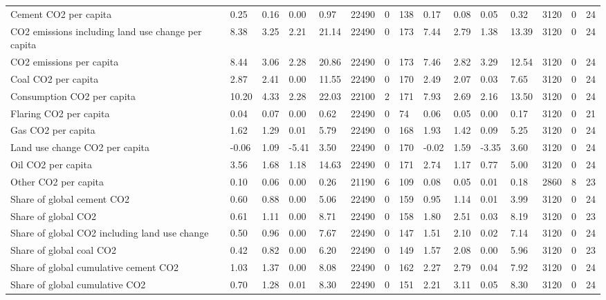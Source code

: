 \begin{longtable}{lllllllllllllll}
\addlinespace
Cement CO2 per capita & 0.25 & 0.16 & 0.00 & 0.97 & 22490 & 0 & 138 & 0.17 & 0.08 & 0.05 & 0.32 & 3120 & 0 & 24\\
CO2 emissions including land use change per capita & 8.38 & 3.25 & 2.21 & 21.14 & 22490 & 0 & 173 & 7.44 & 2.79 & 1.38 & 13.39 & 3120 & 0 & 24\\
CO2 emissions per capita & 8.44 & 3.06 & 2.28 & 20.86 & 22490 & 0 & 173 & 7.46 & 2.82 & 3.29 & 12.54 & 3120 & 0 & 24\\
Coal CO2 per capita & 2.87 & 2.41 & 0.00 & 11.55 & 22490 & 0 & 170 & 2.49 & 2.07 & 0.03 & 7.65 & 3120 & 0 & 24\\
Consumption CO2 per capita & 10.20 & 4.33 & 2.28 & 22.03 & 22100 & 2 & 171 & 7.93 & 2.69 & 2.16 & 13.50 & 3120 & 0 & 24\\
\addlinespace
Flaring CO2 per capita & 0.04 & 0.07 & 0.00 & 0.62 & 22490 & 0 & 74 & 0.06 & 0.05 & 0.00 & 0.17 & 3120 & 0 & 21\\
Gas CO2 per capita & 1.62 & 1.29 & 0.01 & 5.79 & 22490 & 0 & 168 & 1.93 & 1.42 & 0.09 & 5.25 & 3120 & 0 & 24\\
Land use change CO2 per capita & -0.06 & 1.09 & -5.41 & 3.50 & 22490 & 0 & 170 & -0.02 & 1.59 & -3.35 & 3.60 & 3120 & 0 & 24\\
Oil CO2 per capita & 3.56 & 1.68 & 1.18 & 14.63 & 22490 & 0 & 171 & 2.74 & 1.17 & 0.77 & 5.00 & 3120 & 0 & 24\\
Other CO2 per capita & 0.10 & 0.06 & 0.00 & 0.26 & 21190 & 6 & 109 & 0.08 & 0.05 & 0.01 & 0.18 & 2860 & 8 & 23\\
\addlinespace
Share of global cement CO2 & 0.60 & 0.88 & 0.00 & 5.06 & 22490 & 0 & 159 & 0.95 & 1.14 & 0.01 & 3.99 & 3120 & 0 & 24\\
Share of global CO2 & 0.61 & 1.11 & 0.00 & 8.71 & 22490 & 0 & 158 & 1.80 & 2.51 & 0.03 & 8.19 & 3120 & 0 & 23\\
Share of global CO2 including land use change & 0.50 & 0.96 & 0.00 & 7.67 & 22490 & 0 & 147 & 1.51 & 2.10 & 0.02 & 7.14 & 3120 & 0 & 24\\
Share of global coal CO2 & 0.42 & 0.82 & 0.00 & 6.20 & 22490 & 0 & 149 & 1.57 & 2.08 & 0.00 & 5.96 & 3120 & 0 & 23\\
Share of global cumulative cement CO2 & 1.03 & 1.37 & 0.00 & 8.08 & 22490 & 0 & 162 & 2.27 & 2.79 & 0.04 & 7.92 & 3120 & 0 & 24\\
\addlinespace
Share of global cumulative CO2 & 0.70 & 1.28 & 0.01 & 8.30 & 22490 & 0 & 151 & 2.21 & 3.11 & 0.05 & 8.30 & 3120 & 0 & 24\\

\end{longtable}
